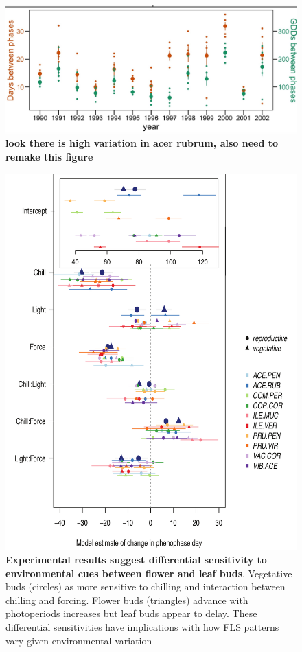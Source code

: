 \documentclass[11pt]{article}
\begin{document}
\begin{figure}[h!]
    \centering
 \includegraphics[width=\textwidth]{..//Plots/Flobuds_manuscript_figs/hypothesis1_acerub.jpeg}
    \caption{\textbf{look there is high variation in acer rubrum, also need to remake this figure}}
    \label{fig:acerub}
\end{figure}

\begin{figure}[h!]
    \centering
 \includegraphics[width=\textwidth]{..//Plots/Flobuds_manuscript_figs/budburstvsflowering.pdf}
    \caption{\textbf{Experimental results suggest differential sensitivity to environmental cues between flower and leaf buds}. Vegetative buds (circles) as more sensitive to chilling and interaction between chilling and forcing. Flower buds (triangles) advance with photoperiods increases but leaf buds appear to delay. These differential sensitivities have implications with how FLS patterns vary given environmental variation}
    \label{fig:model}
\end{figure}
\end{document}
